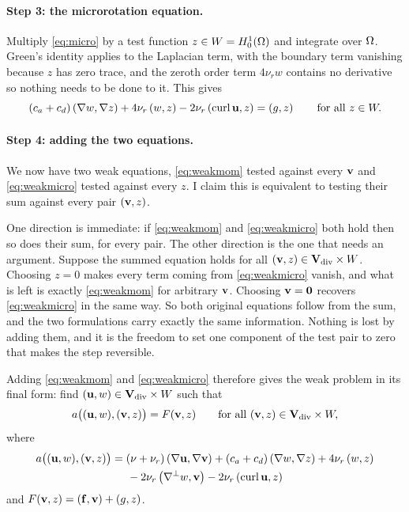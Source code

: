 \documentclass[11pt,a4paper]{article}
\begin{document}
\paragraph{Step 3: the microrotation equation.}
Multiply \eqref{eq:micro} by a test function $z \in W = H^{1}_{0}(\Omega)$ and integrate
over $\Omega$. Green's identity applies to the Laplacian term, with the boundary
term vanishing because $z$ has zero trace, and the zeroth order term $4\nu_{r}w$
contains no derivative so nothing needs to be done to it. This gives
\begin{equation}\label{eq:weakmicro}
  (c_{a}+c_{d}) \left( \nabla w , \nabla z \right)
  + 4\nu_{r} \left( w , z \right)
  - 2\nu_{r} \left( \operatorname{curl} \mathbf{u} , z \right)
  = \left( g , z \right)
  \qquad \text{for all } z \in W .
\end{equation}

\paragraph{Step 4: adding the two equations.}
We now have two weak equations, \eqref{eq:weakmom} tested against every $\mathbf{v}$
and \eqref{eq:weakmicro} tested against every $z$. I claim this is equivalent to
testing their sum against every pair $(\mathbf{v}, z)$.

One direction is immediate: if \eqref{eq:weakmom} and \eqref{eq:weakmicro} both
hold then so does their sum, for every pair. The other direction is the one that
needs an argument. Suppose the summed equation holds for all
$(\mathbf{v}, z) \in \mathbf{V}_{\mathrm{div}} \times W$. Choosing $z = 0$ makes every
term coming from \eqref{eq:weakmicro} vanish, and what is left is exactly
\eqref{eq:weakmom} for arbitrary $\mathbf{v}$. Choosing $\mathbf{v} = \mathbf{0}$ recovers
\eqref{eq:weakmicro} in the same way. So both original equations follow from the
sum, and the two formulations carry exactly the same information. Nothing is
lost by adding them, and it is the freedom to set one component of the test pair
to zero that makes the step reversible.

Adding \eqref{eq:weakmom} and \eqref{eq:weakmicro} therefore gives the weak
problem in its final form: find
$(\mathbf{u}, w) \in \mathbf{V}_{\mathrm{div}} \times W$ such that
\begin{equation}\label{eq:weak}
  a\big( (\mathbf{u}, w), (\mathbf{v}, z) \big) = F(\mathbf{v}, z)
  \qquad \text{for all } (\mathbf{v}, z) \in \mathbf{V}_{\mathrm{div}} \times W ,
\end{equation}
where
\begin{multline}\label{eq:bilinear}
  a\big( (\mathbf{u}, w), (\mathbf{v}, z) \big)
  = (\nu + \nu_{r}) \left( \nabla \mathbf{u} , \nabla \mathbf{v} \right)
  + (c_{a}+c_{d}) \left( \nabla w , \nabla z \right)
  + 4\nu_{r} \left( w , z \right) \\
  {} - 2\nu_{r} \left( \nabla^{\perp} w , \mathbf{v} \right)
  - 2\nu_{r} \left( \operatorname{curl} \mathbf{u} , z \right)
\end{multline}
and $F(\mathbf{v}, z) = \left( \mathbf{f} , \mathbf{v} \right) + \left( g , z \right)$.
\end{document}
